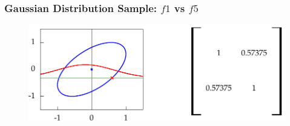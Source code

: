 \documentclass[10pt]{beamer}
\begin{document}
  \begin{frame}[noframenumbering]
    \frametitle{Gaussian Distribution Sample: $f1$ vs $f5$}

    \begin{figure}
      \centering
      \includegraphics[width=\textwidth]{covariance2.png}
    \end{figure}
  \end{frame}
\end{document}
